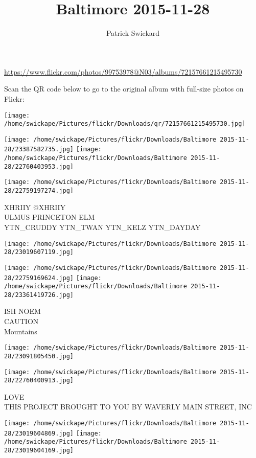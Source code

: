 \documentclass[10pt,letterpaper]{article}
\title{Baltimore 2015-11-28}
\author{Patrick Swickard}
\date{}
\begin{document}
\maketitle

\url{https://www.flickr.com/photos/99753978@N03/albums/72157661215495730}

Scan the QR code below to go to the original album with full-size photos on Flickr:

\texttt{[image: /home/swickape/Pictures/flickr/Downloads/qr/72157661215495730.jpg]}
\pagebreak

\texttt{[image: /home/swickape/Pictures/flickr/Downloads/Baltimore 2015-11-28/23387582735.jpg]}
\texttt{[image: /home/swickape/Pictures/flickr/Downloads/Baltimore 2015-11-28/22760403953.jpg]}

\texttt{[image: /home/swickape/Pictures/flickr/Downloads/Baltimore 2015-11-28/22759197274.jpg]}

XHRIIY @XHRIIY\\
ULMUS PRINCETON ELM\\
YTN\_CRUDDY YTN\_TWAN YTN\_KELZ YTN\_DAYDAY
\pagebreak

\texttt{[image: /home/swickape/Pictures/flickr/Downloads/Baltimore 2015-11-28/23019607119.jpg]}

\vspace{0.25in}
\texttt{[image: /home/swickape/Pictures/flickr/Downloads/Baltimore 2015-11-28/22759169624.jpg]}
\texttt{[image: /home/swickape/Pictures/flickr/Downloads/Baltimore 2015-11-28/23361419726.jpg]}

ISH NOEM\\
CAUTION\\
Mountains
\pagebreak

\texttt{[image: /home/swickape/Pictures/flickr/Downloads/Baltimore 2015-11-28/23091805450.jpg]}

\vspace{0.25in}
\texttt{[image: /home/swickape/Pictures/flickr/Downloads/Baltimore 2015-11-28/22760400913.jpg]}

LOVE\\
THIS PROJECT BROUGHT TO YOU BY WAVERLY MAIN STREET, INC
\pagebreak

\texttt{[image: /home/swickape/Pictures/flickr/Downloads/Baltimore 2015-11-28/23019604869.jpg]}
\texttt{[image: /home/swickape/Pictures/flickr/Downloads/Baltimore 2015-11-28/23019604169.jpg]}
\end{document}
